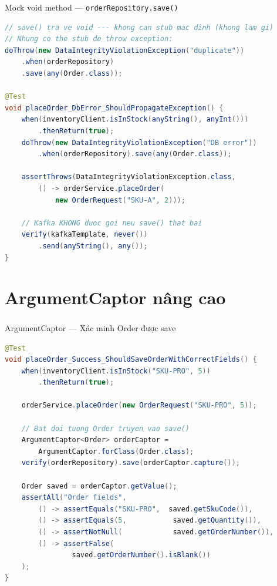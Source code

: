 \documentclass[aspectratio=169,10pt]{beamer}
\newcommand{\sref}[1]{\textsuperscript{\scriptsize\cite{#1}}}
\begin{document}
\begin{frame}[fragile]{Mock void method --- \texttt{orderRepository.save()}}
\begin{lstlisting}[language=java]
// save() tra ve void --- khong can stub mac dinh (khong lam gi)
// Nhung co the stub de throw exception:
doThrow(new DataIntegrityViolationException("duplicate"))
    .when(orderRepository)
    .save(any(Order.class));

@Test
void placeOrder_DbError_ShouldPropagateException() {
    when(inventoryClient.isInStock(anyString(), anyInt()))
        .thenReturn(true);
    doThrow(new DataIntegrityViolationException("DB error"))
        .when(orderRepository).save(any(Order.class));

    assertThrows(DataIntegrityViolationException.class,
        () -> orderService.placeOrder(
            new OrderRequest("SKU-A", 2)));

    // Kafka KHONG duoc goi neu save() that bai
    verify(kafkaTemplate, never())
        .send(anyString(), any());
}
\end{lstlisting}
\end{frame}

\section{ArgumentCaptor nâng cao}

\begin{frame}[fragile]{ArgumentCaptor --- Xác minh Order được save\sref{mockito}}
\begin{lstlisting}[language=java]
@Test
void placeOrder_Success_ShouldSaveOrderWithCorrectFields() {
    when(inventoryClient.isInStock("SKU-PRO", 5))
        .thenReturn(true);

    orderService.placeOrder(new OrderRequest("SKU-PRO", 5));

    // Bat doi tuong Order truyen vao save()
    ArgumentCaptor<Order> orderCaptor =
        ArgumentCaptor.forClass(Order.class);
    verify(orderRepository).save(orderCaptor.capture());

    Order saved = orderCaptor.getValue();
    assertAll("Order fields",
        () -> assertEquals("SKU-PRO",  saved.getSkuCode()),
        () -> assertEquals(5,           saved.getQuantity()),
        () -> assertNotNull(            saved.getOrderNumber()),
        () -> assertFalse(
                saved.getOrderNumber().isBlank())
    );
}
\end{lstlisting}
\end{frame}
\end{document}
